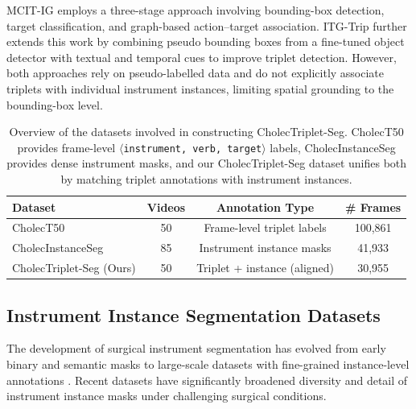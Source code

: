 \documentclass[pdflatex,sn-mathphys-num]{sn-jnl}%
\newcommand{\ivttriplet}{\texttt{$\langle$instrument, verb, target$\rangle$}\xspace}
\theoremstyle{thmstyleone}%
\theoremstyle{thmstyletwo}%
\theoremstyle{thmstylethree}%
\begin{document}
MCIT-IG \cite{sharma2023surgical_tfn} employs a three-stage approach involving bounding-box detection, target classification, and graph-based action–target association. ITG-Trip \cite{pei2025instrument} further extends this work by combining pseudo bounding boxes from a fine-tuned object detector with textual and temporal cues to improve triplet detection. However, both approaches rely on pseudo-labelled data and do not explicitly associate triplets with individual instrument instances, limiting spatial grounding to the bounding-box level.


\begin{table}[t]
\centering
\caption{
Overview of the datasets involved in constructing CholecTriplet-Seg. 
CholecT50 provides frame-level \ivttriplet labels, 
CholecInstanceSeg provides dense instrument masks, and our CholecTriplet-Seg dataset unifies both by matching triplet annotations with instrument instances.
}
\begin{tabular}{l|c|c|c}
\hline
Dataset & Videos & Annotation Type & \# Frames \\
\hline
CholecT50~\cite{nwoye2022rendezvous} & 50 & Frame-level triplet labels  & 100,861 \\
CholecInstanceSeg~\cite{alabi2025cholecinstanceseg} & 85 & Instrument instance masks  & 41,933 \\
CholecTriplet-Seg (Ours) & 50 & Triplet + instance (aligned) & 30,955 \\
\hline
\end{tabular}
\label{tab:dataset_overview}
\end{table}

\subsection{Instrument Instance Segmentation Datasets}
The development of surgical instrument segmentation has evolved from early binary and semantic masks to large-scale datasets with fine-grained instance-level annotations \cite{ahmed2024deep}. Recent datasets have significantly broadened 
diversity and detail of
instrument instance masks under challenging surgical conditions.
\end{document}
